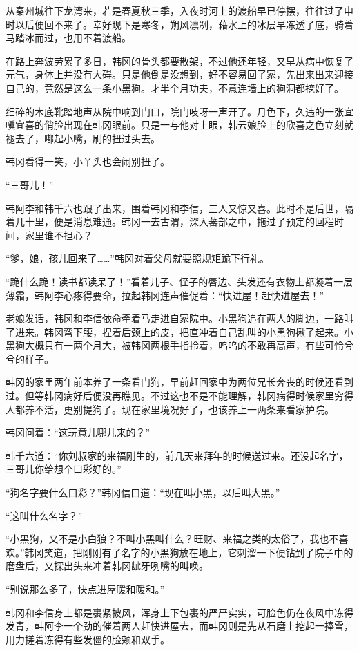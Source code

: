 从秦州城往下龙湾来，若是春夏秋三季，入夜时河上的渡船早已停摆，往往过了申时以后便回不来了。幸好现下是寒冬，朔风凛冽，藉水上的冰层早冻透了底，骑着马踏冰而过，也用不着渡船。

在路上奔波劳累了多日，韩冈的骨头都要散架，不过他还年轻，又早从病中恢复了元气，身体上并没有大碍。只是他倒是没想到，好不容易回了家，先出来出来迎接自己的，竟然是这么一条小黑狗。才半个月功夫，不意连墙上的狗洞都挖好了。

细碎的木底靴踏地声从院中响到门口，院门吱呀一声开了。月色下，久违的一张宜嗔宜喜的俏脸出现在韩冈眼前。只是一与他对上眼，韩云娘脸上的欣喜之色立刻就褪去了，嘟起小嘴，刷的扭过头去。

韩冈看得一笑，小丫头也会闹别扭了。

“三哥儿！”

韩阿李和韩千六也跟了出来，围着韩冈和李信，三人又惊又喜。此时不是后世，隔着几十里，便是消息难通。韩冈一去古渭，深入蕃部之中，拖过了预定的回程时间，家里谁不担心？

“爹，娘，孩儿回来了……”韩冈对着父母就要照规矩跪下行礼。

“跪什么跪！读书都读呆了！”看着儿子、侄子的唇边、头发还有衣物上都凝着一层薄霜，韩阿李心疼得要命，拉起韩冈连声催促着：“快进屋！赶快进屋去！”

老娘发话，韩冈和李信依命牵着马走进自家院中。小黑狗追在两人的脚边，一路叫了进来。韩冈弯下腰，捏着后颈上的皮，把直冲着自己乱叫的小黑狗揪了起来。小黑狗大概只有一两个月大，被韩冈两根手指拎着，呜呜的不敢再高声，有些可怜兮兮的样子。

韩冈的家里两年前本养了一条看门狗，早前赶回家中为两位兄长奔丧的时候还看到过。但等韩冈病好后便没再瞧见。不过这也不是不能理解，韩冈病得时候家里穷得人都养不活，更别提狗了。现在家里境况好了，也该养上一两条来看家护院。

韩冈问着：“这玩意儿哪儿来的？”

韩千六道：“你刘叔家的来福刚生的，前几天来拜年的时候送过来。还没起名字，三哥儿你给想个口彩好的。”

“狗名字要什么口彩？”韩冈信口道：“现在叫小黑，以后叫大黑。”

“这叫什么名字？”

“小黑狗，又不是小白狼？不叫小黑叫什么？旺财、来福之类的太俗了，我也不喜欢。”韩冈笑道，把刚刚有了名字的小黑狗放在地上，它刺溜一下便钻到了院子中的磨盘后，又探出头来冲着韩冈龇牙咧嘴的叫唤。

“别说那么多了，快点进屋暖和暖和。”

韩冈和李信身上都是裹紧披风，浑身上下包裹的严严实实，可脸色仍在夜风中冻得发青，韩阿李一个劲的催着两人赶快进屋去，而韩冈则是先从石磨上挖起一捧雪，用力搓着冻得有些发僵的脸颊和双手。

